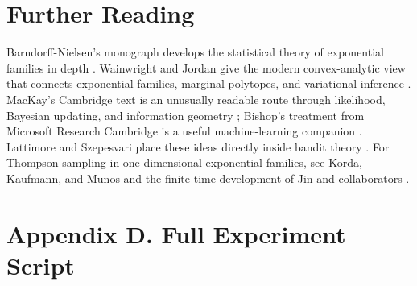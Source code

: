 \documentclass[en,nofont,11pt]{elegantbook}
\begin{document}
\chapter*{Further Reading}

Barndorff-Nielsen's monograph develops the statistical theory of exponential families in depth \cite{barndorff1978information}. Wainwright and Jordan give the modern convex-analytic view that connects exponential families, marginal polytopes, and variational inference \cite{wainwright2008graphical}. MacKay's Cambridge text is an unusually readable route through likelihood, Bayesian updating, and information geometry \cite{mackay2003information}; Bishop's treatment from Microsoft Research Cambridge is a useful machine-learning companion \cite{bishop2006pattern}. Lattimore and Szepesvari place these ideas directly inside bandit theory \cite{lattimore2020bandit}. For Thompson sampling in one-dimensional exponential families, see Korda, Kaufmann, and Munos \cite{korda2013thompson} and the finite-time development of Jin and collaborators \cite{jin2022expts}.


\chapter*{Appendix D. Full Experiment Script}



\nocite{barndorff1978information,brown1986fundamentals,wainwright2008graphical,mackay2003information,bishop2006pattern,ghahramani2015probabilistic,banerjee2005bregman,lattimore2020bandit,lai1985,garivier2011klucb,korda2013thompson,jin2022expts}
\printbibliography
\end{document}

